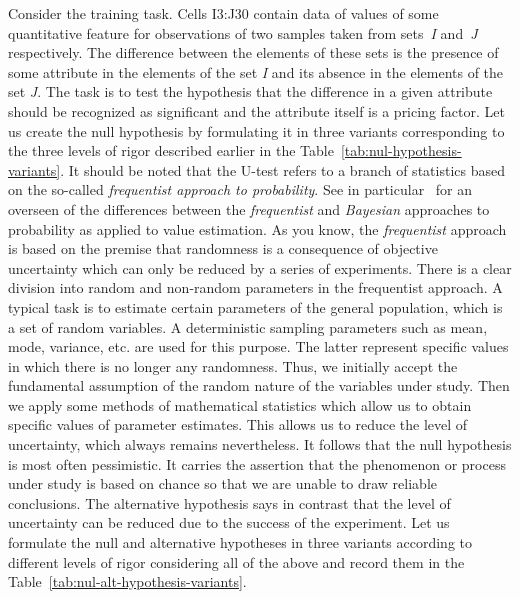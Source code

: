 \documentclass[]{scrreprt}
\begin{document}
Consider the training task. Cells I3:J30 contain data of values of some quantitative feature for observations of two samples taken from sets~\textit{I} and~\textit{J} respectively. The difference between the elements of these sets is the presence of some attribute in the elements of the set \textit{I} and its absence in the elements of the set \textit{J}. The task is to test the hypothesis that the difference in a given attribute should be recognized as significant and the attribute itself is a pricing factor. Let us create the null hypothesis by formulating it in three variants corresponding to the three levels of rigor described earlier in the Table~\ref{tab:nul-hypothesis-variants}. It should be noted that the U-test refers to a branch of statistics based on the so-called \emph{frequentist approach to probability}. See in particular~\cite{Murashev:freq-baye-prob} for an overseen of the differences between the \emph{frequentist} and \emph{Bayesian} approaches to probability as applied to value estimation. As you know, the \emph{frequentist} approach is based on the premise that randomness is a consequence of objective uncertainty which can only be reduced by a series of experiments. There is a clear division into random and non-random parameters in the frequentist approach. A typical task is to estimate certain parameters of the general population, which is a set of random variables. A deterministic sampling parameters such as mean, mode, variance, etc. are used for this purpose. The latter represent specific values in which there is no longer any randomness. Thus, we initially accept the fundamental assumption of the random nature of the variables under study. Then we apply some methods of mathematical statistics which allow us to obtain specific values of parameter estimates. This allows us to reduce the level of uncertainty, which always remains nevertheless. It follows that the null hypothesis is most often pessimistic. It carries the assertion that the phenomenon or process under study is based on chance so that we are unable to draw reliable conclusions. The alternative hypothesis says in contrast that the level of uncertainty can be reduced due to the success of the experiment. Let us formulate the null and alternative hypotheses in three variants according to different levels of rigor considering all of the above and record them in the Table~\ref{tab:nul-alt-hypothesis-variants}.
%
\end{document}
